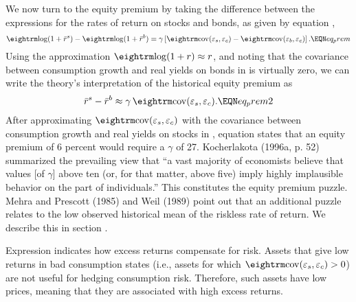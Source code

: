 We now turn to the equity premium by taking the difference between
the expressions for the rates of return on stocks and bonds, as given
by equation ,
$$
{\rm log}(1+ \bar r^s) - {\rm log}(1+ \bar r^b)
   = \gamma \left[ \cov(\varepsilon_{s}, \varepsilon_{c})
                   - \cov(\varepsilon_{b}, \varepsilon_{c}) \right].  \EQN eq_prem
$$
Using the approximation ${\rm log}(1+ r) \approx r$,
and noting that the covariance between consumption growth and real
yields on bonds in  is virtually zero, we can write the theory's
interpretation of the historical equity premium as
$$
\bar r^s - \bar r^b \approx \gamma \,\cov(\varepsilon_{s}, \varepsilon_{c}).
                                                                 \EQN eq_prem2
$$
After approximating $\cov(\varepsilon_{s}, \varepsilon_{c})$ with the covariance
between consumption growth and real yields on stocks in ,
equation  states that an equity premium of 6 percent would
require a $\gamma$ of 27. Kocherlakota (1996a, p. 52) summarized the prevailing
view that ``a vast majority of economists believe that values [of $\gamma$]
above ten (or, for that matter, above five) imply highly implausible behavior
on the part of individuals.''
This constitutes the equity premium puzzle.
Mehra and Prescott (1985) and Weil (1989) point out that an additional
puzzle relates to the low observed historical mean of the riskless rate of return.
We describe this {\it {}} in section .%

Expression  indicates how excess returns compensate for  risk.  Assets
that give low returns in bad consumption states (i.e., assets for which $\cov(\varepsilon_{s}, \varepsilon_{c}) > 0$)
are not useful for hedging consumption risk.  Therefore, such assets have low prices, meaning that they are associated
with high excess returns.

